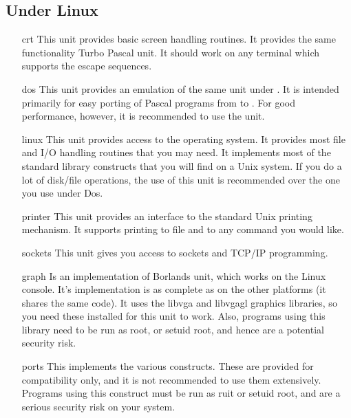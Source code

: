 \documentclass{book}
\begin{document}
\subsection{Under Linux}
\begin{itemize}
\item [crt] This unit provides basic screen handling routines.
It provides the same functionality Turbo Pascal  unit.
It should work on any terminal which supports the  escape
sequences.
\item [dos] This unit provides an emulation of the same unit under \dos.
It is intended primarily for easy porting of Pascal programs from \dos
to \linux. For good performance, however, it is recommended to use the
 unit.
\item [linux] This unit provides access to the
\linux operating system. It provides most file and I/O handling routines
that you may need. It implements most of the standard  library constructs
that you will find on a Unix system. If you do a lot of disk/file
operations, the use of this unit is recommended over the one you use under
Dos.
\item [printer] This unit provides an interface to the standard Unix
printing mechanism. It supports printing to file and to any command you
would like.
\item [sockets] This unit gives you access to sockets and TCP/IP
programming.
\item [graph] Is an implementation of Borlands  unit, which
works on the Linux console. It's implementation is as complete as on
the other platforms (it shares the same code).
It uses the libvga and libvgagl graphics libraries, so you need these
installed for this unit to work. Also, programs using this library need
to be run as root, or setuid root, and hence are a potential security risk.
\item [ports] This implements the various  constructs. These are
provided for compatibility only, and it is not recommended to use them
extensively. Programs using this construct must be run as ruit or setuid
root, and are a serious security risk on your system.
\end{itemize}
\end{document}
